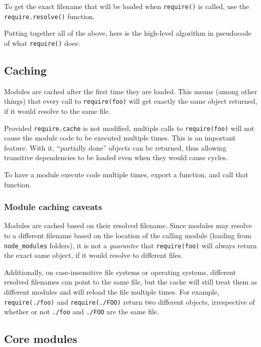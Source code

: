 To get the exact filename that will be loaded when \texttt{require()} is
called, use the \texttt{require.resolve()} function.

Putting together all of the above, here is the high-level algorithm in
pseudocode of what \texttt{require()} does:

\subsection{Caching}\label{caching}

Modules are cached after the first time they are loaded. This means
(among other things) that every call to
\texttt{require(\textquotesingle{}foo\textquotesingle{})} will get
exactly the same object returned, if it would resolve to the same file.

Provided \texttt{require.cache} is not modified, multiple calls to
\texttt{require(\textquotesingle{}foo\textquotesingle{})} will not cause
the module code to be executed multiple times. This is an important
feature. With it, ``partially done'' objects can be returned, thus
allowing transitive dependencies to be loaded even when they would cause
cycles.

To have a module execute code multiple times, export a function, and
call that function.

\subsubsection{Module caching caveats}\label{module-caching-caveats}

Modules are cached based on their resolved filename. Since modules may
resolve to a different filename based on the location of the calling
module (loading from \texttt{node\_modules} folders), it is not a
\emph{guarantee} that
\texttt{require(\textquotesingle{}foo\textquotesingle{})} will always
return the exact same object, if it would resolve to different files.

Additionally, on case-insensitive file systems or operating systems,
different resolved filenames can point to the same file, but the cache
will still treat them as different modules and will reload the file
multiple times. For example,
\texttt{require(\textquotesingle{}./foo\textquotesingle{})} and
\texttt{require(\textquotesingle{}./FOO\textquotesingle{})} return two
different objects, irrespective of whether or not \texttt{./foo} and
\texttt{./FOO} are the same file.

\subsection{Core modules}\label{core-modules}

